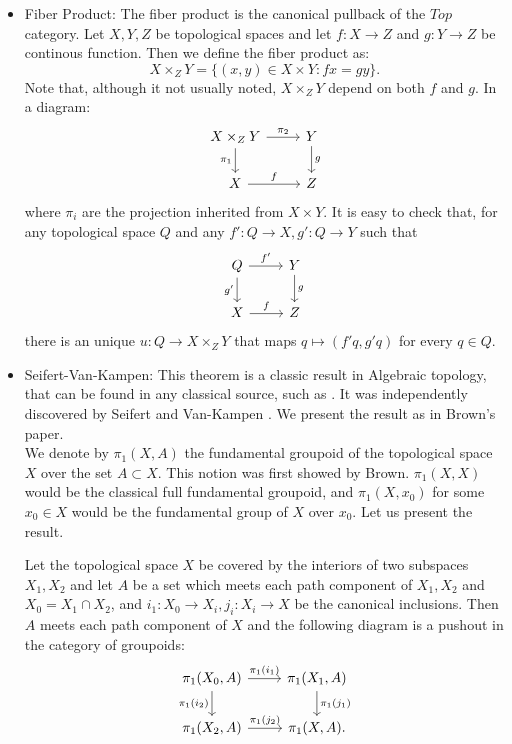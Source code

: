 \begin{example}
  \begin{itemize}
  \item Fiber Product: The fiber product is the canonical pullback of the $Top$ category. Let $X,Y,Z$ be topological spaces and let $f:X\to Z$ and $g: Y\to Z$ be continous function. Then we define the fiber product as:
    $$X\times_ZY = \{(x,y) \in X\times Y: fx=gy\}.$$ Note that, although it not usually noted, $X\times_Z Y$ depend on both $f$ and $g$. In a diagram:
\[
  \begin{tikzcd}
    X\times_Z Y\arrow{r}{\pi_2}\arrow[swap]{d}{\pi_1} & Y\arrow{d}{g}\\
    X\arrow{r}{f} & Z
\end{tikzcd}
\]
where $\pi_i$ are the projection inherited from $X\times Y$. It is easy to check that, for any topological space $Q$ and any $f':Q\to X, g': Q \to Y$ such that
\[
  \begin{tikzcd}
    Q\arrow{r}{f'}\arrow[swap]{d}{g'} & Y\arrow{d}{g}\\
    X\arrow{r}{f} & Z
\end{tikzcd}
\]
there is an unique $u:Q\to X\times_Z Y$ that maps $q\mapsto (f'q,g'q)$ for every $q\in Q$.\\
\item Seifert-Van-Kampen: This theorem is a classic result in Algebraic topology, that can be found in any classical source, such as \cite{munkres2000topology}. It was independently discovered by Seifert \cite{seifert1931konstruktion} and Van-Kampen \cite{van1933connection}.  We present the result as in  Brown's paper\cite{brown1967groupoids}.\\

  We denote by $\pi_1(X,A)$ the fundamental groupoid of the topological space $X$ over the set $A\subset X$. This notion was first showed by Brown. $\pi_1(X,X)$ would be the classical full fundamental groupoid, and $\pi_1(X,x_0)$ for some $x_0\in X$ would be the fundamental group of $X$ over $x_0$. Let us present the result.
  \begin{theorem}
Let the topological space $X$  be covered by the interiors of two subspaces $X_1,X_2$ and let $A$
 be a set which meets each path component of $X_1, X_2$ and $X_0=X_1\cap X_2$, and $i_1: X_0 \to X_i,j_i: X_i \to X $ be the canonical inclusions. Then $A$  meets each path component of $X$  and the following diagram is a pushout in the category of groupoids:
\[
  \begin{tikzcd}
    \pi_1(X_0,A)\arrow{r}{\pi_1(i_1)}\arrow[swap]{d}{\pi_1(i_2)} & \pi_1(X_1,A)\arrow{d}{\pi_1(j_1)}\\
    \pi_1(X_2,A)\arrow{r}{\pi_1(j_2)} & \pi_1(X,A).\\
\end{tikzcd}
\]

\end{theorem}


\end{itemize}
\end{example}

